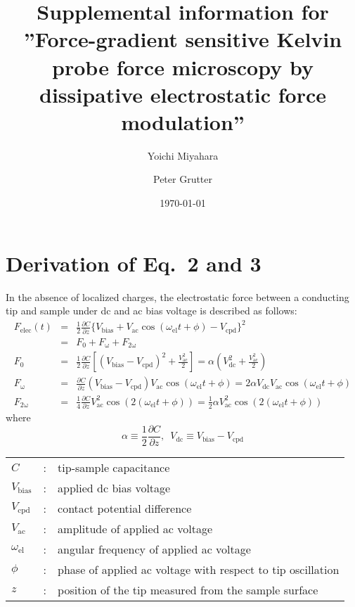 \documentclass[preprint]{revtex4-1}
\newcommand{\Felec}{F_\mathrm{elec}}
\newcommand{\Vbias}{V_\mathrm{bias}}
\newcommand{\Vcpd}{V_\mathrm{cpd}}
\newcommand{\dcdz}{\frac{\partial C}{\partial z}}
\newcommand{\Vdc}{V_\mathrm{dc}}
\newcommand{\Vac}{V_\mathrm{ac}}
\newcommand{\Fdc}{F_\mathrm{0}}
\newcommand{\Fw}{F_\mathrm{\omega}}
\newcommand{\Fww}{F_\mathrm{2\omega}}
\newcommand{\wel}{\omega_\mathrm{el}}
\begin{document}
\title{Supplemental information for\\
''Force-gradient sensitive Kelvin probe force microscopy 
by dissipative electrostatic force modulation''}

\author{Yoichi Miyahara}%
\author{Peter Grutter}%

\date{\today}

\maketitle
\section{Derivation of Eq.~2 and 3}
In the absence of localized charges, 
the electrostatic force between a conducting tip and sample under dc and ac bias voltage
is described as follows:
\begin{eqnarray}
      \Felec (t) & = & \frac{1}{2}\dcdz \{\Vbias +\Vac \cos (\wel t + \phi) - \Vcpd\}^2 \\
      & = & \Fdc + \Fw + \Fww \nonumber \\
       \Fdc & = & \frac{1}{2} \dcdz \left[(\Vbias - \Vcpd)^2 + \frac{\Vac ^2}{2}\right] \label{Fdc} 
       = \alpha \left(\Vdc ^2 + \frac{\Vac^2}{2} \right)\\ 
       \Fw &= &  \dcdz (\Vbias - \Vcpd)\Vac \cos (\wel t + \phi) 
       = 2\alpha \Vdc \Vac \cos (\wel t + \phi)  \label{Fw} \\ 
       \Fww & = & \frac{1}{4} \dcdz \Vac ^2 \cos (2(\wel t + \phi))  \label{F2w} 
       = \frac{1}{2}\alpha \Vac^2 \cos (2(\wel t + \phi))
\end{eqnarray}
where
\[ 
  \label{eq:alpha}
         \alpha \equiv \frac{1}{2}\dcdz \nonumber, \,\,\,  \Vdc \equiv \Vbias - \Vcpd
\]


\begin{tabular}{l l l}
  $C$ & : & tip-sample capacitance\\
  $\Vbias$ & : &applied dc bias voltage\\
  $\Vcpd$ & : & contact potential difference\\
  $\Vac$ & : & amplitude of applied ac voltage\\
  $\wel$ & : & angular frequency of applied ac voltage\\
  $\phi$ & : & phase of applied ac voltage with respect to tip oscillation\\
  $z$ & : & position of the tip measured from the sample surface
\end{tabular}
\vspace*{5mm}
\end{document}
